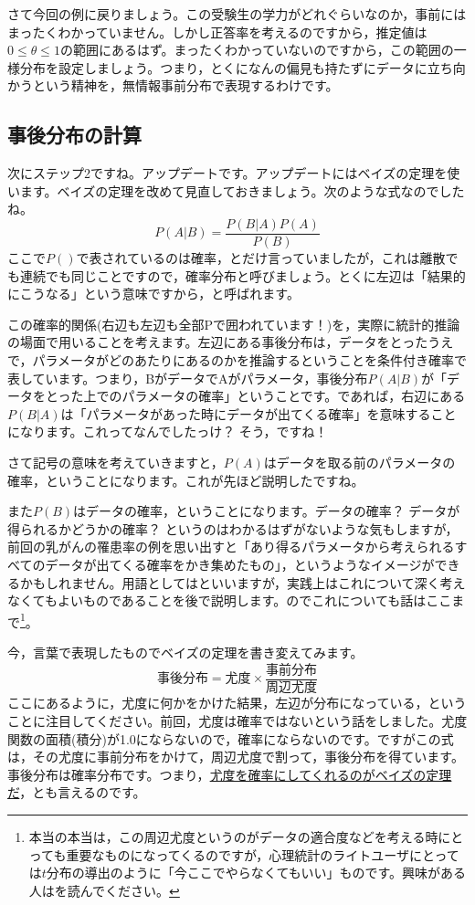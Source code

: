 \documentclass{ltjsbook}
\begin{document}
さて今回の例に戻りましょう。この受験生の学力がどれぐらいなのか，事前にはまったくわかっていません。しかし正答率を考えるのですから，推定値は$0 \le \theta \le 1$の範囲にあるはず。まったくわかっていないのですから，この範囲の一様分布を設定しましょう。つまり，とくになんの偏見も持たずにデータに立ち向かうという精神を，無情報事前分布で表現するわけです。


\subsection{事後分布の計算}
次にステップ2ですね。アップデートです。アップデートにはベイズの定理を使います。ベイズの定理を改めて見直しておきましょう。次のような式なのでしたね。
\[ P(A|B) = \frac{P(B|A)P(A)}{P(B)}\]
ここで$P()$で表されているのは確率，とだけ言っていましたが，これは離散でも連続でも同じことですので，確率分布と呼びましょう。とくに左辺は「結果的にこうなる」という意味ですから，と呼ばれます。

この確率的関係(右辺も左辺も全部Pで囲われています！)を，実際に統計的推論の場面で用いることを考えます。左辺にある事後分布は，データをとったうえで，パラメータがどのあたりにあるのかを推論するということを条件付き確率で表しています。つまり，BがデータでAがパラメータ，事後分布$P(A|B)$が「データをとった上でのパラメータの確率」ということです。であれば，右辺にある$P(B|A)$は「パラメータがあった時にデータが出てくる確率」を意味することになります。これってなんでしたっけ？ そう，ですね！

さて記号の意味を考えていきますと，$P(A)$はデータを取る前のパラメータの確率，ということになります。これが先ほど説明したですね。

また$P(B)$はデータの確率，ということになります。データの確率？ データが得られるかどうかの確率？ というのはわかるはずがないような気もしますが，前回の乳がんの罹患率の例を思い出すと「あり得るパラメータから考えられるすべてのデータが出てくる確率をかき集めたもの」，というようなイメージができるかもしれません。用語としてはといいますが，実践上はこれについて深く考えなくてもよいものであることを後で説明します。のでこれについても話はここまで\footnote{本当の本当は，この周辺尤度というのがデータの適合度などを考える時にとっても重要なものになってくるのですが，心理統計のライトユーザにとっては$t$分布の導出のように「今ここでやらなくてもいい」ものです。興味がある人は\textcite{Hamada201912}を読んでください。}。

今，言葉で表現したものでベイズの定理を書き変えてみます。
\[ \mbox{事後分布} = \mbox{尤度} \times \frac{事前分布}{周辺尤度}\]
ここにあるように，尤度に何かをかけた結果，左辺が分布になっている，ということに注目してください。前回，尤度は確率ではないという話をしました。尤度関数の面積(積分)が1.0にならないので，確率にならないのです。ですがこの式は，その尤度に事前分布をかけて，周辺尤度で割って，事後分布を得ています。事後分布は確率分布です。つまり，\underline{尤度を確率にしてくれるのがベイズの定理だ}，とも言えるのです。
\end{document}
